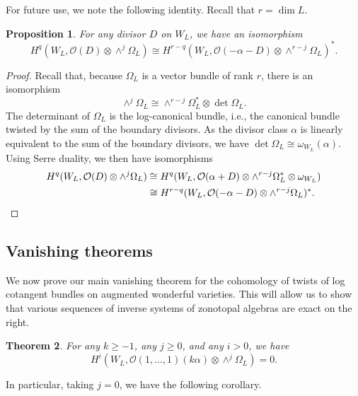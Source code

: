 \documentclass{amsart}
\newtheorem{theorem}{Theorem}[section]
\newtheorem{proposition}[theorem]{Proposition}
\theoremstyle{definition}
\begin{document}
For future use, we note the following identity. Recall that $r = \dim L$. 

\begin{proposition}\label{prop:SD}
For any divisor $D$ on $W_L$, we have an isomorphism
$$H^q(W_L, \mathcal{O}(D) \otimes \wedge^j \Omega_L) \cong H^{r - q}(W_L, \mathcal{O}(-\alpha - D) \otimes \wedge^{r-j} \Omega_L)^*.$$
\end{proposition}

\begin{proof}
Recall that, because $\Omega_{L}$ is a vector bundle of rank $r$, there is an isomorphism
$$\wedge^j \Omega_L  \cong \wedge^{r-j} \Omega_{L}^* \otimes \det \Omega_{L}.$$
The determinant of $\Omega_L$ is the log-canonical bundle, i.e., the canonical bundle twisted by the sum of the boundary divisors. As the divisor class $\alpha$ is linearly equivalent to the sum of the boundary divisors, we have $\det \Omega_L \cong \omega_{W_L}(\alpha)$. Using Serre duality, we then have isomorphisms
\begin{equation*}\begin{split}
H^q(W_L, \mathcal{O}(D) \otimes \wedge^j \Omega_L) & \cong H^q(W_L, \mathcal{O}(\alpha + D) \otimes \wedge^{r - j} \Omega_L^* \otimes \omega_{W_L} ) \\ 
& \cong H^{r - q}(W_L, \mathcal{O}(-\alpha - D) \otimes \wedge^{r-j} \Omega_L)^*. \qedhere
\end{split}\end{equation*}
\end{proof}



\subsection{Vanishing theorems}\label{sec:vanishing}

  We now prove our main vanishing theorem for the cohomology of twists 
  of log cotangent bundles on augmented wonderful varieties. This will 
  allow us to show that various sequences of inverse systems of 
  zonotopal algebras are exact on the right. 


\begin{theorem}\label{thm:vanishing}
For any $k \ge -1$, any $j \ge 0$, and any $i > 0$, we have 
$$H^i(W_L, \mathcal{O}(1, \dotsc, 1)(k\alpha) \otimes \wedge^j \Omega_L) = 0.$$
\end{theorem}

In particular, taking $j = 0$, we have the following corollary. 
\end{document}
